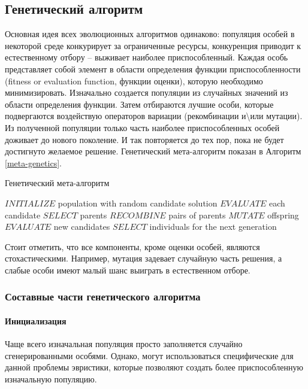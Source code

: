 \documentclass{fefu_thesis/cls/fefu}
\newenvironment{algo}[1][]
  {\begin{algorithm}[#1]
     \selectlanguage{english}
     \floatname{algorithm}{Алгоритм}
  }
  {\end{algorithm}}
\newcommand*\talgref[1]{Алгоритм \ref{#1}}
\begin{document}
    \subsection{Генетический алгоритм}
    Основная идея всех эволюционных алгоритмов одинаково: популяция особей в некоторой среде конкурирует за ограниченные ресурсы, конкуренция приводит к естественному отбору -- выживает наиболее приспособленный. Каждая особь представляет собой элемент в области определения функции приспособленности (fitness or evaluation function, функции оценки), которую необходимо минимизировать. Изначально создается популяции из случайных значений из области определения функции. Затем отбираются лучшие особи, которые подвергаются воздействую операторов вариации (рекомбинации и\textbackslash или мутации). Из полученной популяции только часть наиболее приспособленных особей доживает до нового поколение. И так повторяется до тех пор, пока не будет достигнуто желаемое решение. Генетический мета-алгоритм показан в \talgref{meta-genetics}.

    \begin{algo}[H]
        \caption{Генетический мета-алгоритм}
        \label{meta-genetics}
        \begin{algorithmic}[1]
            \State $INITIALIZE$ population with random candidate solution
            \State $EVALUATE$ each candidate
                \State $SELECT$ parents
                \State $RECOMBINE$ pairs of parents
                \State $MUTATE$ offspring
                \State $EVALUATE$ new candidates
                \State $SELECT$ individuals for the next generation
            \EndWhile
        \end{algorithmic}
    \end{algo}

    Стоит отметить, что все компоненты, кроме оценки особей, являются стохастическими. Например, мутация задевает случайную часть решения, а слабые особи имеют малый шанс выиграть в естественном отборе.

    \subsubsection{Составные части генетического алгоритма}
    \paragraph{Инициализация}
    Чаще всего изначальная популяция просто заполняется случайно сгенерированными особями. Однако, могут использоваться специфические для данной проблемы эвристики, которые позволяют создать более приспособленную изначальную популяцию.
\end{document}
